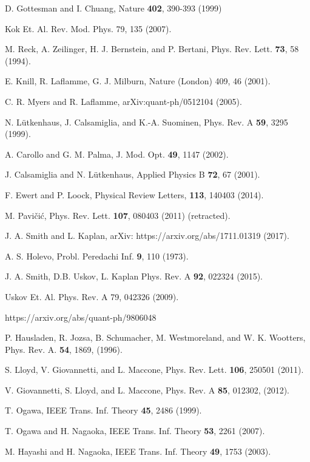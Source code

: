 \documentclass[aps,pra,twocolumn,showpacs,superscriptaddress,floatfix,10pt]{revtex4}
\begin{document}
\begin{thebibliography}{99}
	
 D. Gottesman and I. Chuang, Nature {\bf 402}, 390-393 (1999)

 Kok Et. Al.
Rev. Mod. Phys. 79, 135 (2007).

 M. Reck, A. Zeilinger, H. J. Bernstein, and P. Bertani, Phys. Rev. Lett. {\bf 73}, 58 (1994).

  E. Knill, R. Laflamme, G. J. Milburn, Nature (London) 409, 46 (2001).

 C. R. Myers and R. Laflamme, arXiv:quant-ph/0512104 (2005).

 N. L\"utkenhaus, J. Calsamiglia, and K.-A. Suominen, Phys. Rev. A {\bf 59}, 3295 (1999).

 A. Carollo and G. M. Palma, J. Mod. Opt. {\bf 49}, 1147 (2002).

 J. Calsamiglia and N. L\"utkenhaus, Applied Physics B {\bf 72}, 67 (2001).

 F. Ewert and P. Loock, Physical Review Letters, {\bf 113}, 140403 (2014).

 M. Pavi\v{c}i\'c, Phys. Rev. Lett. {\bf 107}, 080403 (2011) (retracted).

 J. A. Smith and L. Kaplan, arXiv: https://arxiv.org/abs/1711.01319 (2017).

 A. S. Holevo, Probl. Peredachi Inf. \textbf{9}, 110 (1973).	

 J. A. Smith, D.B. Uskov, L. Kaplan Phys. Rev. A \textbf{92}, 022324 (2015).

 Uskov Et. Al.
Phys. Rev. A 79, 042326 (2009).

 https://arxiv.org/abs/quant-ph/9806048

 P. Hausladen, R. Jozsa, B. Schumacher, M. Westmoreland, and W. K. Wootters, Phys. Rev. A. \textbf{54}, 1869, (1996).

 S. Lloyd, V. Giovannetti, and L. Maccone, Phys. Rev. Lett. \textbf{106}, 250501 (2011).

 V. Giovannetti, S. Lloyd, and L. Maccone, Phys. Rev. A \textbf{85}, 012302, (2012).

 T. Ogawa, IEEE Trans. Inf. Theory \textbf{45}, 2486 (1999).

 T. Ogawa and H. Nagaoka, IEEE Trans. Inf. Theory \textbf{53}, 2261 (2007).

 M. Hayashi and H. Nagaoka, IEEE Trans. Inf. Theory \textbf{49}, 1753 (2003).

\end{thebibliography}
\end{document}
